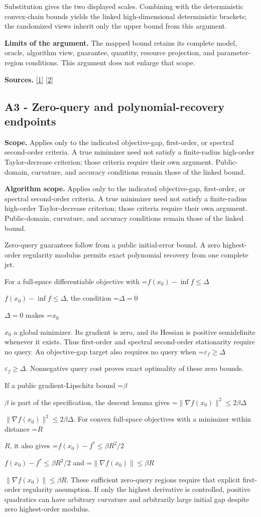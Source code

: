 \documentclass[10pt,a4paper]{article}
\newcommand{\AtlasMath}[1]{\par\begingroup\centering\setbox0=\hbox{$\displaystyle #1$}\ifdim\wd0>1.4\linewidth\typeout{ATLAS WIDE FORMULA: \the\wd0}\fi\ifdim\wd0>\linewidth\resizebox{\linewidth}{!}{\box0}\else\box0\fi\par\endgroup}
\newcommand{\AtlasInlineMath}[1]{\begingroup\setbox0=\hbox{$#1$}\ifdim\wd0>.4\linewidth\endgroup\AtlasMath{#1}\else\endgroup$#1$\fi}
\begin{document}
Substitution gives the two displayed scales. Combining with the deterministic convex-chain bounds yields the linked high-dimensional deterministic brackets; the randomized views inherit only the upper bound from this argument.

\textbf{Limits of the argument.} The mapped bound retains its complete model, oracle, algorithm view, guarantee, quantity, resource projection, and parameter-region conditions. This argument does not enlarge that scope.

\textbf{Sources.} \href{https://arxiv.org/pdf/2411.08987v2}{[1]} \href{https://arxiv.org/pdf/2205.09647v1}{[2]}

\subsection{A3 - Zero-query and polynomial-recovery endpoints}
\textbf{Scope.} Applies only to the indicated objective-gap, first-order, or spectral second-order criteria. A true minimizer need not satisfy a finite-radius high-order Taylor-decrease criterion; those criteria require their own argument. Public-domain, curvature, and accuracy conditions remain those of the linked bound.

\textbf{Algorithm scope.} Applies only to the indicated objective-gap, first-order, or spectral second-order criteria. A true minimizer need not satisfy a finite-radius high-order Taylor-decrease criterion; those criteria require their own argument. Public-domain, curvature, and accuracy conditions remain those of the linked bound.

Zero-query guarantees follow from a public initial-error bound. A zero highest-order regularity modulus permits exact polynomial recovery from one complete jet.

For a full-space differentiable objective with \AtlasInlineMath{f(x_0)-\inf f\le\Delta}, the condition \AtlasInlineMath{\Delta=0} makes \AtlasInlineMath{x_0} a global minimizer. Its gradient is zero, and its Hessian is positive semidefinite whenever it exists. Thus first-order and spectral second-order stationarity require no query. An objective-gap target also requires no query when \AtlasInlineMath{\varepsilon_f\ge\Delta}. Nonnegative query cost proves exact optimality of these zero bounds.

If a public gradient-Lipschitz bound \AtlasInlineMath{\beta} is part of the specification, the descent lemma gives \AtlasInlineMath{\|\nabla f(x_0)\|^2\le2\beta\Delta}. For convex full-space objectives with a minimizer within distance \AtlasInlineMath{R}, it also gives \AtlasInlineMath{f(x_0)-f^*\le\beta R^2/2} and \AtlasInlineMath{\|\nabla f(x_0)\|\le\beta R}. These sufficient zero-query regions require that explicit first-order regularity assumption. If only the highest derivative is controlled, positive quadratics can have arbitrary curvature and arbitrarily large initial gap despite zero highest-order modulus.
\end{document}
